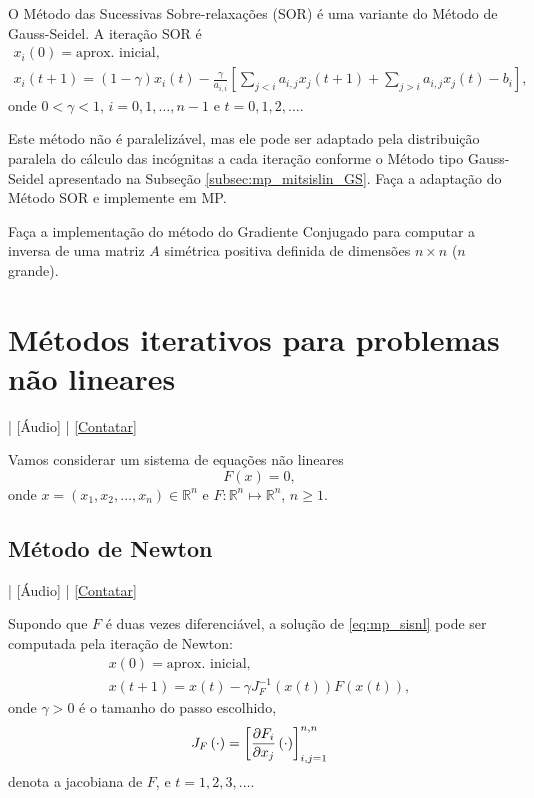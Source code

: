 \begin{exer}
  O Método das Sucessivas Sobre-relaxações (SOR) é uma variante do Método de Gauss-Seidel. A iteração SOR é
  \begin{gather}
    x_i(0) = \text{aprox. inicial},\\
    x_i(t+1) = (1-\gamma)x_i(t) - \frac{\gamma}{a_{i,i}}\left[\sum_{j<i}a_{i,j}x_j(t+1) + \sum_{j>i}a_{i,j}x_j(t) - b_i\right],
  \end{gather}
  onde $0<\gamma<1$, $i=0,1,\dotsc,n-1$ e $t=0,1,2,\ldots$.

  Este método não é paralelizável, mas ele pode ser adaptado pela distribuição paralela do cálculo das incógnitas a cada iteração conforme o Método tipo Gauss-Seidel apresentado na Subseção \ref{subsec:mp_mitsislin_GS}. Faça a adaptação do Método SOR e implemente em MP.
\end{exer}

\begin{exer}
  Faça a implementação do método do Gradiente Conjugado para computar a inversa de uma matriz $A$ simétrica positiva definida de dimensões $n\times n$ ($n$ grande).
\end{exer}

\section{Métodos iterativos para problemas não lineares}\label{cap_mp_sec_itnl}

\begin{flushright}
  [Vídeo] | [Áudio] | \href{https://phkonzen.github.io/notas/contato.html}{[Contatar]}
\end{flushright}

Vamos considerar um sistema de equações não lineares
\begin{equation}\label{eq:mp_sisnl}
  F(x) = 0,
\end{equation}
onde $x=(x_1,x_2,\dotsc,x_n)\in\mathbb{R}^n$ e $F:\mathbb{R}^n\mapsto \mathbb{R}^n$, $n\geq 1$.

\subsection{Método de Newton}

\begin{flushright}
  [Vídeo] | [Áudio] | \href{https://phkonzen.github.io/notas/contato.html}{[Contatar]}
\end{flushright}

Supondo que $F$ é duas vezes diferenciável, a solução de \eqref{eq:mp_sisnl} pode ser computada pela iteração de Newton:
\begin{gather}
  x(0) = \text{aprox. inicial},\\
  x(t+1) = x(t) - \gamma J_F^{-1}\left(x(t)\right)F\left(x(t)\right),\label{eq:mp_newton_iter0}
\end{gather}
onde $\gamma>0$ é o tamanho do passo escolhido, 
\begin{equation}
  J_F\left(\cdot\right) = \left[\frac{\partial F_i}{\partial x_j}\left(\cdot\right)\right]_{i,j=1}^{n,n}
\end{equation}
denota a jacobiana de $F$, e $t=1,2,3,\ldots$.

